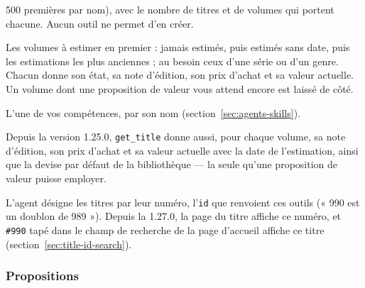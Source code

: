 \begin{description}[style=nextline]
        500 premières par nom), avec le nombre de titres et de volumes
        qui portent chacune. Aucun outil ne permet d'en créer.
  \item[\texttt{list\_volumes\_to\_value}] Les volumes à estimer en
        premier : jamais estimés, puis estimés sans date, puis les
        estimations les plus anciennes ; au besoin ceux d'une série ou
        d'un genre. Chacun donne son état, sa note d'édition, son prix
        d'achat et sa valeur actuelle. Un volume dont une proposition
        de valeur vous attend encore est laissé de côté.
  \item[\texttt{get\_skill}] L'une de vos compétences, par son nom
        (section~\ref{sec:agents-skills}).
\end{description}

Depuis la version 1.25.0, \texttt{get\_title} donne aussi, pour chaque
volume, sa note d'édition, son prix d'achat et sa valeur actuelle avec
la date de l'estimation, ainsi que la devise par défaut de la
bibliothèque --- la seule qu'une proposition de valeur puisse
employer.

L'agent désigne les titres par leur numéro, l'\texttt{id} que renvoient
ces outils (« 990 est un doublon de 989 »). Depuis la 1.27.0, la page du
titre affiche ce numéro, et \texttt{\#990} tapé dans le champ de
recherche de la page d'accueil affiche ce titre
(section~\ref{sec:title-id-search}).

\subsubsection*{Propositions}

